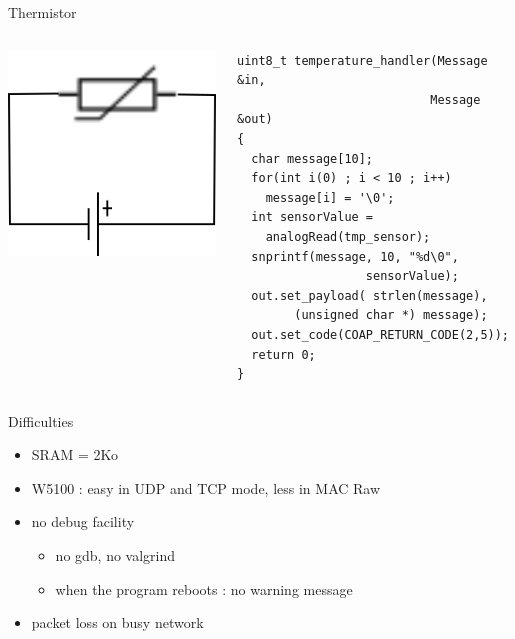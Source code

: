 \begin{frame}[containsverbatim]{Thermistor}
	\begin{columns}[c,onlytextwidth]
		\begin{column}[c]{.5\textwidth}
			\begin{center}
				\includegraphics [width=.9\textwidth,keepaspectratio]{img/thermistor.png}
			\end{center}
		\end{column}
		\begin{column}[c]{.5\textwidth}
\begin{Verbatim}[fontsize=\scriptsize]
uint8_t temperature_handler(Message &in, 
                           Message &out) 
{
  char message[10];
  for(int i(0) ; i < 10 ; i++)
    message[i] = '\0';
  int sensorValue = 
    analogRead(tmp_sensor);
  snprintf(message, 10, "%d\0", 
                  sensorValue);
  out.set_payload( strlen(message), 
        (unsigned char *) message);
  out.set_code(COAP_RETURN_CODE(2,5));
  return 0;
}
\end{Verbatim}
		\end{column}
	\end{columns}
\end{frame}

\begin{frame} {Difficulties}
    \begin{itemize}
		\item SRAM = 2Ko
		\item W5100 : easy in UDP and TCP mode, less in MAC Raw
		\item no debug facility
		\begin{itemize}
			\item no gdb, no valgrind
			\item when the program reboots : no warning message
		\end{itemize}
		\item packet loss on busy network
    \end{itemize}
\end{frame}


